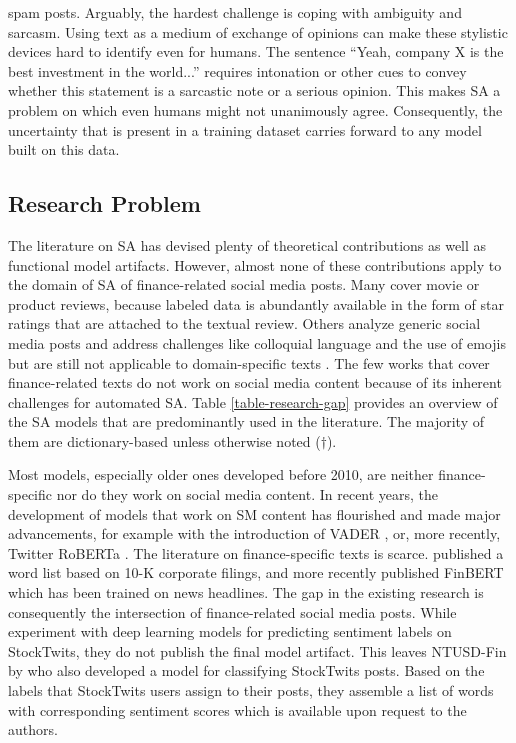 spam posts. Arguably, the hardest challenge is coping with ambiguity and sarcasm. Using text as a medium of exchange of opinions can make these stylistic devices hard to identify even for humans. The sentence ``Yeah, company X is the best investment in the world...'' requires intonation or other cues to convey whether this statement is a sarcastic note or a serious opinion. This makes SA a problem on which even humans might not unanimously agree. Consequently, the uncertainty that is present in a training dataset carries forward to any model built on this data.





\subsection{Research Problem}
\label{section-research-gap}
The literature on SA has devised plenty of theoretical contributions as well as functional model artifacts. However, almost none of these contributions apply to the domain of SA of finance-related social media posts. Many cover movie or product reviews, because labeled data is abundantly available in the form of star ratings that are attached to the textual review. Others analyze generic social media posts and address challenges like colloquial language and the use of emojis but are still not applicable to domain-specific texts . The few works that cover finance-related texts \cite{loughranMcD2011, araci2019finbert}  do not work on social media content because of its inherent challenges for automated SA. Table \ref{table-research-gap} provides an overview of the SA models that are predominantly used in the literature. The majority of them are dictionary-based unless otherwise noted ($\dagger$).



Most models, especially older ones developed before 2010, are neither finance-specific nor do they work on social media content. In recent years, the development of models that work on SM content has flourished and made major advancements, for example with the introduction of VADER , or, more recently, Twitter RoBERTa . The literature on finance-specific texts is scarce.  published a word list based on 10-K corporate filings, and more recently  published FinBERT which has been trained on news headlines. The gap in the existing research is consequently the intersection of finance-related social media posts. While  experiment with deep learning models for predicting sentiment labels on StockTwits, they do not publish the final model artifact. This leaves NTUSD-Fin by  who also developed a model for classifying StockTwits posts. Based on the labels that StockTwits users assign to their posts, they assemble a list of words with corresponding sentiment scores which is available upon request to the authors.

